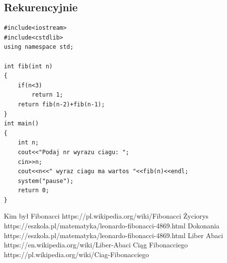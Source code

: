 \documentclass{report}
\begin{document}
\subsection{Rekurencyjnie}
\begin{lstlisting}
#include<iostream>
#include<cstdlib>
using namespace std;

int fib(int n)
{
	if(n<3)
		return 1;
	return fib(n-2)+fib(n-1);
}
int main()
{
	int n;
	cout<<"Podaj nr wyrazu ciagu: ";
	cin>>n;
	cout<<n<<" wyraz ciagu ma wartos "<<fib(n)<<endl;
	system("pause");
	return 0;
}
\end{lstlisting}
\newpage
\begin{thebibliography}{9}
 Kim był Fibonacci https://pl.wikipedia.org/wiki/Fibonacci
 Życiorys https://eszkola.pl/matematyka/leonardo-fibonacci-4869.html
 Dokonania https://eszkola.pl/matematyka/leonardo-fibonacci-4869.html
 Liber Abaci https://en.wikipedia.org/wiki/Liber-Abaci
 Ciąg Fibonacciego https://pl.wikipedia.org/wiki/Ciag-Fibonacciego

\end{thebibliography}
\listoffigures
\end{document}
